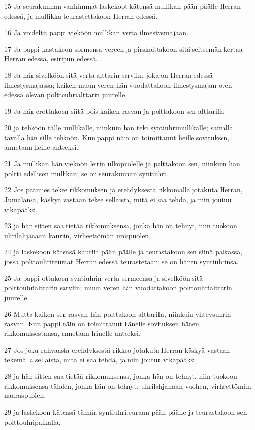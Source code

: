 \par 15 Ja seurakunnan vanhimmat laskekoot kätensä mullikan pään päälle Herran edessä, ja mullikka teurastettakoon Herran edessä.
\par 16 Ja voideltu pappi vieköön mullikan verta ilmestysmajaan.
\par 17 Ja pappi kastakoon sormensa vereen ja pirskoittakoon sitä seitsemän kertaa Herran edessä, esiripun edessä.
\par 18 Ja hän sivelköön sitä verta alttarin sarviin, joka on Herran edessä ilmestysmajassa; kaiken muun veren hän vuodattakoon ilmestysmajan oven edessä olevan polttouhrialttarin juurelle.
\par 19 Ja hän erottakoon siitä pois kaiken rasvan ja polttakoon sen alttarilla
\par 20 ja tehköön tälle mullikalle, niinkuin hän teki syntiuhrimullikalle; samalla tavalla hän sille tehköön. Kun pappi näin on toimittanut heille sovituksen, annetaan heille anteeksi.
\par 21 Ja mullikan hän vieköön leirin ulkopuolelle ja polttakoon sen, niinkuin hän poltti edellisen mullikan; se on seurakunnan syntiuhri.
\par 22 Jos päämies tekee rikkomuksen ja erehdyksestä rikkomalla jotakuta Herran, Jumalansa, käskyä vastaan tekee sellaista, mitä ei saa tehdä, ja niin joutuu vikapääksi,
\par 23 ja hän sitten saa tietää rikkomuksensa, jonka hän on tehnyt, niin tuokoon uhrilahjanaan kauriin, virheettömän urospuolen,
\par 24 ja laskekoon kätensä kauriin pään päälle ja teurastakoon sen siinä paikassa, jossa polttouhriteuraat Herran edessä teurastetaan; se on hänen syntiuhrinsa.
\par 25 Ja pappi ottakoon syntiuhrin verta sormeensa ja sivelköön sitä polttouhrialttarin sarviin; muun veren hän vuodattakoon polttouhrialttarin juurelle.
\par 26 Mutta kaiken sen rasvan hän polttakoon alttarilla, niinkuin yhteysuhrin rasvan. Kun pappi näin on toimittanut hänelle sovituksen hänen rikkomuksestansa, annetaan hänelle anteeksi.
\par 27 Jos joku rahvaasta erehdyksestä rikkoo jotakuta Herran käskyä vastaan tekemällä sellaista, mitä ei saa tehdä, ja niin joutuu vikapääksi,
\par 28 ja hän sitten saa tietää rikkomuksensa, jonka hän on tehnyt, niin tuokoon rikkomuksensa tähden, jonka hän on tehnyt, uhrilahjanaan vuohen, virheettömän naaraspuolen,
\par 29 ja laskekoon kätensä tämän syntiuhriteuraan pään päälle ja teurastakoon sen polttouhripaikalla.
